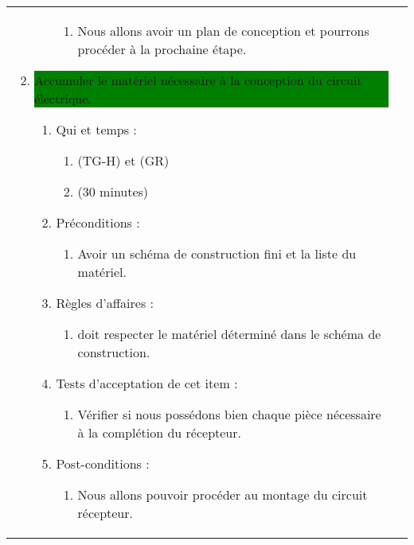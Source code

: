 \begin{longtable}{|l|p{}|}
\begin{enumerate}[label*=\arabic*.]
\begin{enumerate}[label*=\arabic*.]
                    \begin{enumerate}[label*=\arabic*.]
                        \item Nous allons avoir un plan de conception et pourrons procéder à la prochaine étape.
                    \end{enumerate}
                \end{enumerate}
            \item \colorbox{Green}{\parbox{13cm}{ Accumuler le matériel nécessaire à la conception du circuit électrique.}}
            \begin{enumerate}[label*=\arabic*.]
                    \item Qui et temps :
                    \begin{enumerate}[label*=\arabic*.]
                        \item (TG-H) et (GR)
                        \item (30 minutes)
                    \end{enumerate}
                    \item Préconditions :
                    \begin{enumerate}[label*=\arabic*.]
                        \item Avoir un schéma de construction fini et la liste du matériel.
                    \end{enumerate}
                    \item Règles d’affaires :
                    \begin{enumerate}[label*=\arabic*.]
                        \item doit respecter le matériel déterminé dans le schéma de construction.
                    \end{enumerate}
                    \item Tests d'acceptation de cet item :
                    \begin{enumerate}[label*=\arabic*.]
                        \item Vérifier si nous possédons bien chaque pièce nécessaire à la complétion du récepteur.
                    \end{enumerate}
                    \item Post-conditions :
                    \begin{enumerate}[label*=\arabic*.]
                        \item Nous allons pouvoir procéder au montage du circuit récepteur.

\end{enumerate}
\end{enumerate}
\end{enumerate}
\end{longtable}

